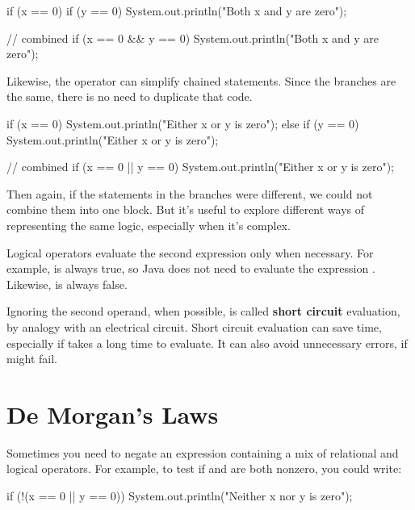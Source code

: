 \begin{code}
if (x == 0) {
    if (y == 0) {
        System.out.println("Both x and y are zero");
    }
}
\end{code}

\begin{code}
// combined
if (x == 0 && y == 0) {
    System.out.println("Both x and y are zero");
}
\end{code}

Likewise, the \java{||} operator can simplify chained  statements.
Since the branches are the same, there is no need to duplicate that code.

\begin{code}
if (x == 0) {
    System.out.println("Either x or y is zero");
} else if (y == 0) {
    System.out.println("Either x or y is zero");
}
\end{code}

\begin{code}
// combined
if (x == 0 || y == 0) {
    System.out.println("Either x or y is zero");
}
\end{code}

Then again, if the statements in the branches were different, we could not combine them into one block.
But it's useful to explore different ways of representing the same logic, especially when it's complex.

\label{shortcircuit}

Logical operators evaluate the second expression only when necessary.
For example,  is always true, so Java does not need to evaluate the expression .
Likewise,  is always false.

Ignoring the second operand, when possible, is called {\bf short circuit} evaluation, by analogy with an electrical circuit.
Short circuit evaluation can save time, especially if  takes a long time to evaluate.
It can also avoid unnecessary errors, if  might fail.


\section{De Morgan's Laws}

Sometimes you need to negate an expression containing a mix of relational and logical operators.
For example, to test if  and  are both nonzero, you could write:

\begin{code}
if (!(x == 0 || y == 0)) {
    System.out.println("Neither x nor y is zero");
}
\end{code}

